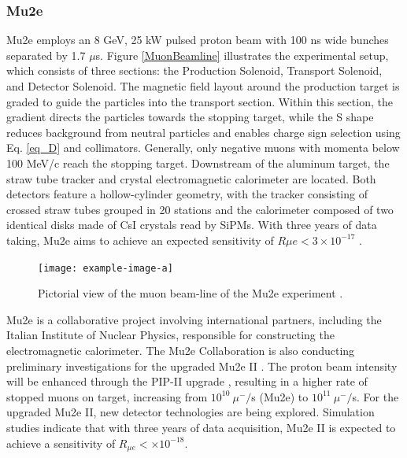 \begin{refsection}
        \subsubsection{Mu2e}
        Mu2e employs an 8 GeV, 25 kW pulsed proton beam with 100 ns wide bunches separated by 1.7 $\mu$s. Figure \ref{MuonBeamline} illustrates the experimental setup, which consists of three sections: the Production Solenoid, Transport Solenoid, and Detector Solenoid. The magnetic field layout around the production target is graded to guide the particles into the transport section. Within this section, the gradient directs the particles towards the stopping target, while the S shape reduces background from neutral particles and enables charge sign selection using Eq. \ref{eq_D} and collimators. Generally, only negative muons with momenta below 100 MeV/c reach the stopping target. Downstream of the aluminum target, the straw tube tracker and crystal electromagnetic calorimeter are located. Both detectors feature a hollow-cylinder geometry, with the tracker consisting of crossed straw tubes grouped in 20 stations and the calorimeter composed of two identical disks made of CsI crystals read by SiPMs. With three years of data taking, Mu2e aims to achieve an expected sensitivity of $R{\mu e}<3\times10^{-17}$ \cite{MTDR}.

\begin{figure}[h!]
\centering
\texttt{[image: example-image-a]}
\caption[Mu2e experiment]{Pictorial view of the muon beam-line of the Mu2e experiment \cite{MTDR}.}
\label{_MuonBeamline}
\end{figure}

Mu2e is a collaborative project involving international partners, including the Italian Institute of Nuclear Physics, responsible for constructing the electromagnetic calorimeter. The Mu2e Collaboration is also conducting preliminary investigations for the upgraded Mu2e II \cite{Mu2e_II:2018}. The proton beam intensity will be enhanced through the PIP-II upgrade \cite{PIP_II:2018}, resulting in a higher rate of stopped muons on target, increasing from $10^{10}\ \mu^-/$s (Mu2e) to $10^{11}\ \mu^-/$s. For the upgraded Mu2e II, new detector technologies are being explored. Simulation studies indicate that with three years of data acquisition, Mu2e II is expected to achieve a sensitivity of $R_{\mu e} < \times10^{-18}$.


\end{refsection}

